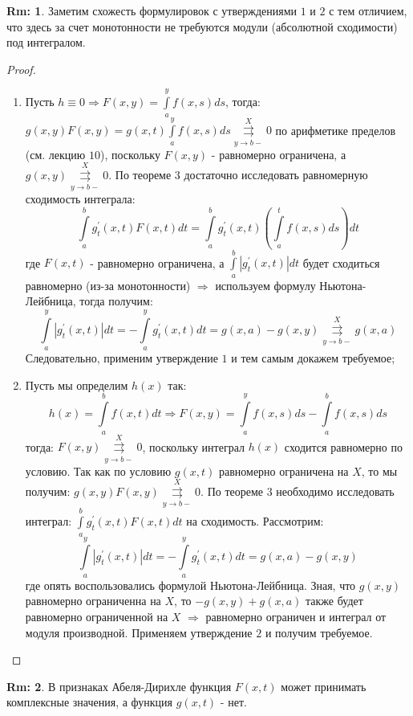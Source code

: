 \documentclass[12pt]{article}
\theoremstyle{definition}
\newtheorem{rem}{Rm:}
\newcommand{\ddint}[2]{\displaystyle\int\limits_{#1}^{#2}}
\newcommand{\uconvm}[2]{\overset{#1}{\underset{#2}{\rightrightarrows}}}
\begin{document}
\begin{rem}
	Заметим схожесть формулировок с утверждениями $1$ и $2$ с тем отличием, что здесь за счет монотонности не требуются модули (абсолютной сходимости) под интегралом.
\end{rem}
\begin{proof}\hfill
	\begin{enumerate}[label=\arabic*)]
		\item Пусть $h \equiv 0 \Rightarrow F(x,y) = \ddint{a}{y}f(x,s)ds$, тогда: $g(x,y) F(x,y) = g(x,t)\ddint{a}{y}f(x,s)ds \uconvm{X}{y \to b-} 0$	по арифметике пределов (см. лекцию $10$), поскольку $F(x,y)$ - равномерно ограничена, а $g(x,y) \uconvm{X}{y \to b-} 0$. По теореме $3$ достаточно исследовать равномерную сходимость интеграла: 
		$$
			\ddint{a}{b}g_t^\prime(x,t)F(x,t)dt = \ddint{a}{b}g_t^\prime(x,t)\left(\ddint{a}{t}f(x,s)ds\right)dt
		$$
		где $F(x,t)$ - равномерно ограничена, а  $\ddint{a}{b}\left|g_t^\prime(x,t)\right|dt$ будет сходиться равномерно (из-за монотонности) $\Rightarrow$ используем формулу Ньютона-Лейбница, тогда получим:
		$$
			\ddint{a}{y}\left|g_t^\prime(x,t)\right|dt = -\ddint{a}{y}g_t^\prime(x,t)dt = g(x,a) - g(x,y) \uconvm{X}{y\to b-} g(x,a)
		$$ 
		Следовательно, применим утверждение $1$ и тем самым докажем требуемое;
		
		\item Пусть мы определим $h(x)$ так:
		$$
			h(x) = \ddint{a}{b}f(x,t)dt \Rightarrow F(x,y) = \ddint{a}{y}f(x,s)ds - \ddint{a}{b}f(x,s)ds
		$$
		тогда: $F(x,y) \uconvm{X}{y \to b-} 0$, поскольку интеграл $h(x)$ сходится равномерно по условию. Так как по условию $g(x,t)$ равномерно ограничена на $X$, то мы получим: $g(x,y)F(x,y) \uconvm{X}{y\to b-} 0$. По теореме $3$ необходимо исследовать интеграл: $\ddint{a}{b}g_t^\prime(x,t) F(x,t)dt$ на сходимость. Рассмотрим:
		$$
			\ddint{a}{y}\left|g_t^\prime(x,t)\right|dt = -\ddint{a}{y}g_t^\prime(x,t)dt = g(x,a) - g(x,y)
		$$
		где опять воспользовались формулой Ньютона-Лейбница. Зная, что $g(x,y)$ равномерно ограниченна на $X$, то $-g(x,y) + g(x,a)$ также будет равномерно ограниченной на $X$ $\Rightarrow$ равномерно ограничен и интеграл от модуля производной. Применяем утверждение $2$ и получим требуемое.
	\end{enumerate}
\end{proof}

\begin{rem}
	В признаках Абеля-Дирихле функция $F(x,t)$ может принимать комплексные значения, а функция $g(x,t)$ - нет.
\end{rem}
\newpage
\end{document}
